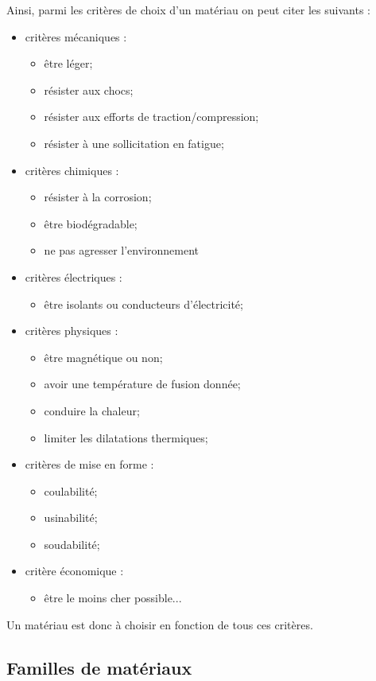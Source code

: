 \documentclass[11pt,oneside]{article}
\begin{document}
Ainsi, parmi les critères de choix d'un matériau on peut citer les suivants :
\begin{itemize}
\item critères mécaniques :
\begin{itemize}
\item être léger;
\item résister aux chocs;
\item résister aux efforts de traction/compression;
\item résister à une sollicitation en fatigue;
\end{itemize}
\item critères chimiques :
\begin{itemize}
\item résister à la corrosion;
\item être biodégradable;
\item ne pas agresser l'environnement
\end{itemize}
\item critères électriques :
\begin{itemize}
\item être isolants ou conducteurs d'électricité;
\end{itemize}
\item critères physiques :
\begin{itemize}
\item être magnétique ou non;
\item avoir une température de fusion donnée;
\item conduire la chaleur;
\item limiter les dilatations thermiques;
\end{itemize}
\item critères de mise en forme :
\begin{itemize}
\item coulabilité; 
\item usinabilité; 
\item soudabilité; 
\end{itemize}
\item critère économique :
\begin{itemize}
\item être le moins cher possible...
\end{itemize}
\end{itemize}

Un matériau est donc à choisir en fonction de tous ces critères. 

\subsection{Familles de matériaux}
\end{document}
